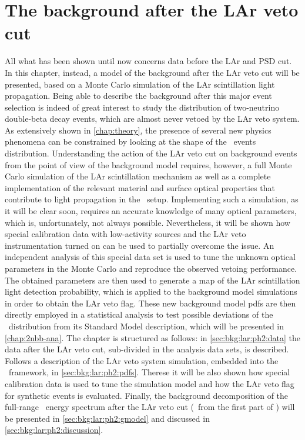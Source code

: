 
\chapter{The background after the LAr veto cut}%
\label{chap:bkg:lar:ph2}

All what has been shown until now concerns data before the LAr and PSD cut. In this
chapter, instead, a model of the background after the LAr veto cut will be presented,
based on a Monte Carlo simulation of the LAr scintillation light propagation. Being able
to describe the background after this major event selection is indeed of great interest to
study the distribution of two-neutrino double-beta decay events, which are almost never
vetoed by the LAr veto system. As extensively shown in \cref{chap:theory}, the presence of
several new physics phenomena can be constrained by looking at the shape of the \nnbb\
events distribution. Understanding the action of the LAr veto cut on background events
from the point of view of the background model requires, however, a full Monte Carlo
simulation of the LAr scintillation mechanism as well as a complete implementation of the
relevant material and surface optical properties that contribute to light propagation in
the \gerda\ setup. Implementing such a simulation, as it will be clear soon, requires an
accurate knowledge of many optical parameters, which is, unfortunately, not always
possible. Nevertheless, it will be shown how special calibration data with low-activity
sources and the LAr veto instrumentation turned on can be used to partially overcome the
issue. An independent analysis of this special data set is used to tune the unknown
optical parameters in the Monte Carlo and reproduce the observed vetoing performance.  The
obtained parameters are then used to generate a map of the LAr scintillation light
detection probability, which is applied to the background model simulations in order to
obtain the LAr veto flag. These new background model pdfs are then directly employed in a
statistical analysis to test possible deviations of the \nnbb\ distribution from its
Standard Model description, which will be presented in \cref{chap:2nbb-ana}.
\newpar
The chapter is structured as follows: in \cref{sec:bkg:lar:ph2:data} the data after the
LAr veto cut, sub-divided in the analysis data sets, is described. Follows a description
of the LAr veto system simulation, embedded into the \mage\ framework, in
\cref{sec:bkg:lar:ph2:pdfs}. Therese it will be also shown how special calibration data is
used to tune the simulation model and how the LAr veto flag for synthetic events is
evaluated. Finally, the background decomposition of the full-range \gerda\ energy spectrum
after the LAr veto cut (\gexpophasetwobkg\ from the first part of \phasetwo) will be
presented in \cref{sec:bkg:lar:ph2:gmodel} and discussed in
\cref{sec:bkg:lar:ph2:discussion}.

